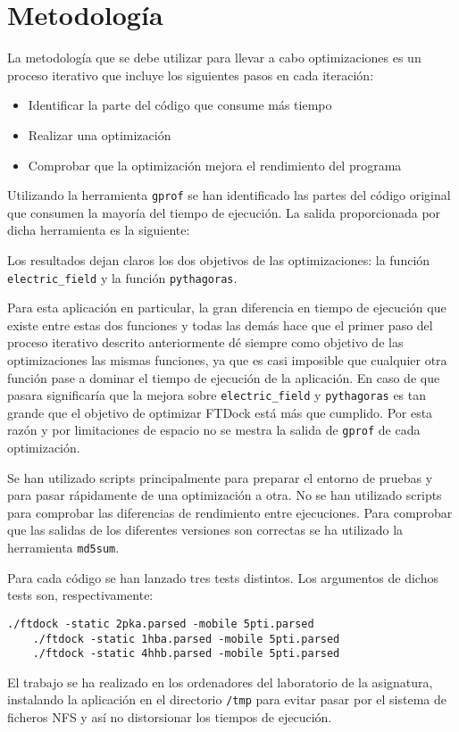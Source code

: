 \section{Metodolog\'{i}a}

La metodolog\'{i}a que se debe utilizar para llevar a cabo optimizaciones es un
proceso iterativo que incluye los siguientes pasos en cada iteraci\'{o}n:

\begin{itemize}
\item Identificar la parte del c\'{o}digo que consume m\'{a}s tiempo
\item Realizar una optimizaci\'{o}n
\item Comprobar que la optimizaci\'{o}n mejora el rendimiento del programa
\end{itemize}

Utilizando la herramienta \texttt{gprof} se han identificado las partes del
c\'{o}digo original que consumen la mayor\'{i}a del tiempo de ejecuci\'{o}n.
La salida proporcionada por dicha herramienta es la siguiente:


Los resultados dejan claros los dos objetivos de las optimizaciones: la
funci\'{o}n \texttt{electric\_field} y la funci\'{o}n \texttt{pythagoras}.

Para esta aplicaci\'{o}n en particular, la gran diferencia en tiempo de
ejecuci\'{o}n que existe entre estas dos funciones y todas las dem\'{a}s hace
que el primer paso del proceso iterativo descrito anteriormente d\'{e} siempre
como objetivo de las optimizaciones las mismas funciones, ya que es casi
imposible que cualquier otra funci\'{o}n pase a dominar el tiempo de
ejecuci\'{o}n de la aplicaci\'{o}n. En caso de que pasara significar\'{i}a que
la mejora sobre \texttt{electric\_field} y \texttt{pythagoras} es tan grande
que el objetivo de optimizar FTDock est\'{a} m\'{a}s que cumplido. Por esta
raz\'{o}n y por limitaciones de espacio no se mestra la salida de \texttt{gprof}
de cada optimizaci\'{o}n.

Se han utilizado scripts principalmente para preparar el entorno de pruebas y
para pasar r\'{a}pidamente de una optimizaci\'{o}n a otra. No se han utilizado
scripts para comprobar las diferencias de rendimiento entre ejecuciones. Para
comprobar que las salidas de los diferentes versiones son correctas se ha
utilizado la herramienta \texttt{md5sum}.

Para cada c\'{o}digo se han lanzado tres tests distintos. Los argumentos de
dichos tests son, respectivamente:

\begin{lstlisting}[]
    ./ftdock -static 2pka.parsed -mobile 5pti.parsed
    ./ftdock -static 1hba.parsed -mobile 5pti.parsed
    ./ftdock -static 4hhb.parsed -mobile 5pti.parsed
\end{lstlisting}

El trabajo se ha realizado en los ordenadores del laboratorio de la asignatura,
instalando la aplicaci\'{o}n en el directorio \texttt{/tmp} para evitar pasar
por el sistema de ficheros NFS y as\'{i} no distorsionar los tiempos de
ejecuci\'{o}n.


